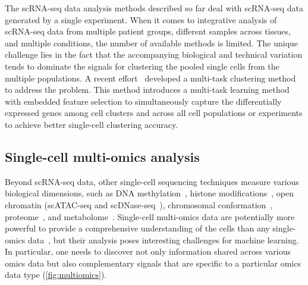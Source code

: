 \documentclass[5p]{elsarticle}
\newcommand{\rev}[1]{{\color{black}#1}}
\begin{document}
\rev{The scRNA-seq data analysis methods described so far} deal with scRNA-seq data generated by a single experiment. When it comes to integrative analysis of scRNA-seq data from multiple patient groups, different samples across tissues, and multiple conditions, the number of available methods is limited. The unique challenge lies in the fact that the accompanying biological and technical variation tends to dominate the signals for clustering the pooled single cells from the multiple populations. A recent effort~\cite{Zhang2018AMC} developed a multi-task clustering method to address the problem. This method introduces a multi-task learning method with embedded feature selection to simultaneously capture the differentially expressed genes among cell clusters and across all cell populations or experiments to achieve better single-cell clustering accuracy.

\subsection{Single-cell multi-omics analysis}

Beyond \rev{scRNA-seq data,} other single-cell sequencing techniques measure various biological dimensions, such as DNA methylation~\cite{smallwood2014single}, histone modifications~\cite{rotem2015single}, open chromatin (scATAC-seq and scDNase-seq~\cite{buenrostro2015single,cusanovich2015multiplex}), chromosomal conformation~\cite{nagano2013single}, proteome~\cite{frei2016highly}, and metabolome~\cite{fessenden2016metabolomics}.
\rev{Sin\-gle-cell} multi-omics data are potentially more powerful to provide a comprehensive understanding of the cells than any single-omics data~\cite{Macaulay2017single}, but their analysis poses interesting challenges for machine learning.
In particular, one needs to discover not only information shared across various omics data but also complementary signals that are specific to a particular omics data type (\autoref{fig:multiomics}).
\end{document}
